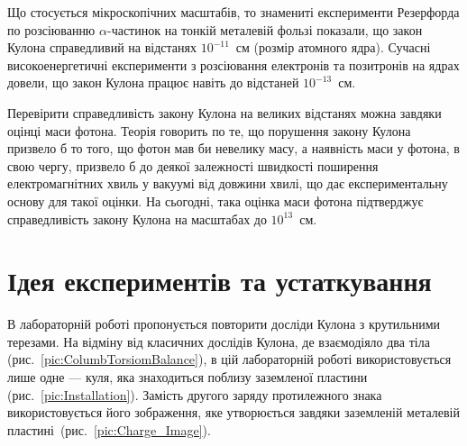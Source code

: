 \documentclass{LabWork}
\begin{document}
Що стосується мікроскопічних масштабів, то знамениті експерименти Резерфорда по розсіюванню $\alpha$-частинок на тонкій металевій фользі показали, що закон Кулона справедливий на відстанях $10^{-11}$~см (розмір атомного ядра). Сучасні високоенергетичні експерименти з розсіювання електронів та позитронів на ядрах довели, що закон Кулона працює навіть до відстаней $10^{-13}$~см.

Перевірити справедливість закону Кулона на великих відстанях можна завдяки оцінці маси фотона. Теорія говорить по те, що порушення закону Кулона призвело б то того, що  фотон мав би невелику масу, а наявність маси у фотона, в свою чергу, призвело б до деякої залежності швидкості поширення електромагнітних хвиль у вакуумі від довжини хвилі, що дає експериментальну основу для такої оцінки.  На сьогодні, така оцінка маси фотона підтверджує справедливість закону Кулона на масштабах до $ 10^{13} $~см. 


\section{Ідея експериментів та устаткування}



В лабораторній роботі пропонується повторити досліди Кулона  з крутильними терезами. На відміну від класичних дослідів Кулона, де взаємодіяло два тіла (рис.~\ref{pic:ColumbTorsiomBalance}), в цій лабораторній роботі використовується лише одне --- куля, яка знаходиться поблизу заземленої пластини (рис.~\ref{pic:Installation}). Замість другого заряду протилежного знака використовується його зображення, яке утворюється завдяки заземленій металевій пластині~(рис.~\ref{pic:Charge_Image}).
\end{document}
